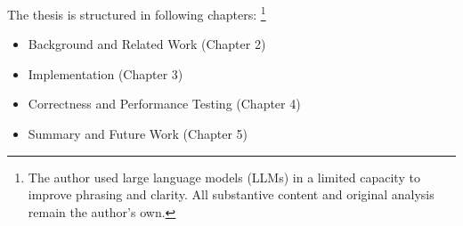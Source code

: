 The thesis is structured in following chapters: \footnote{The author used large language models (LLMs) in a limited capacity to improve phrasing and clarity. All substantive content and original analysis remain the author's own.}

\begin{itemize}
  \item Background and Related Work (Chapter 2)
  \item Implementation (Chapter 3)
  \item Correctness and Performance Testing (Chapter 4)
  \item Summary and Future Work (Chapter 5)
\end{itemize}

